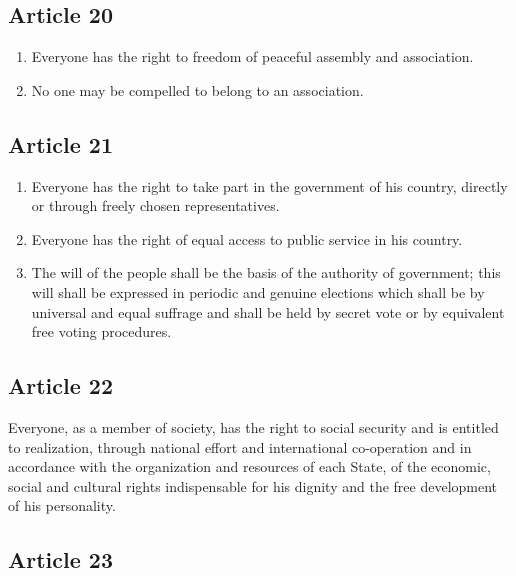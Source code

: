 \documentclass[
  titlepage,
  openright,
  DIV=calc,
  toc=listof,
  listof=nochaptergap]{scrbook}
\begin{document}
\subsection{Article 20}\label{article-20-4}

\begin{enumerate}
\def\labelenumi{\arabic{enumi}.}
\item
  Everyone has the right to freedom of peaceful assembly and
  association.
\item
  No one may be compelled to belong to an association.
\end{enumerate}

\subsection{Article 21}\label{article-21-4}

\begin{enumerate}
\def\labelenumi{\arabic{enumi}.}
\item
  Everyone has the right to take part in the government of his country,
  directly or through freely chosen representatives.
\item
  Everyone has the right of equal access to public service in his
  country.
\item
  The will of the people shall be the basis of the authority of
  government; this will shall be expressed in periodic and genuine
  elections which shall be by universal and equal suffrage and shall be
  held by secret vote or by equivalent free voting procedures.
\end{enumerate}

\subsection{Article 22}\label{article-22-4}

Everyone, as a member of society, has the right to social security and
is entitled to realization, through national effort and international
co-operation and in accordance with the organization and resources of
each State, of the economic, social and cultural rights indispensable
for his dignity and the free development of his personality.

\subsection{Article 23}\label{article-23-4}
\end{document}
